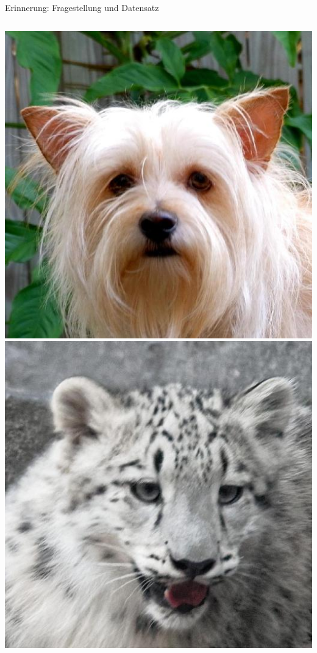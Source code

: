 \documentclass[aspectratio=1610, 9pt]{beamer}
\begin{document}
\begin{frame}{Erinnerung: Fragestellung und Datensatz}
\begin{columns}
    \includegraphics[scale=0.13]{images/dog.jpg}\\
    \includegraphics[scale=0.13]{images/wildlife.jpg}\\
  \end{columns}

\end{frame}
\end{document}
